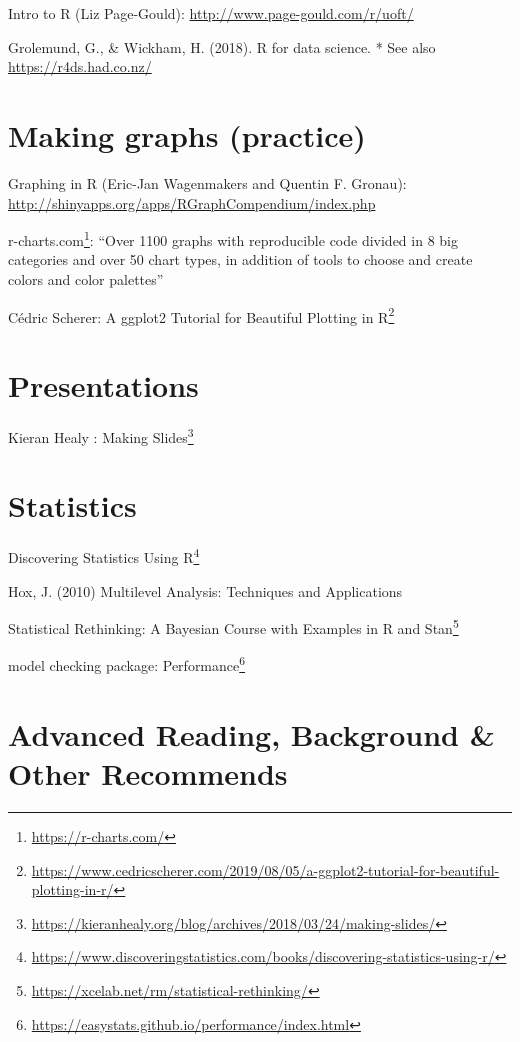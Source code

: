\documentclass[
  12pt,
  a5paper,
]{book}
\DeclareRobustCommand{\href}[2]{#2\footnote{\url{#1}}}
\begin{document}
Intro to R (Liz Page-Gould): \url{http://www.page-gould.com/r/uoft/}

Grolemund, G., \& Wickham, H. (2018). R for data science.
* See also \url{https://r4ds.had.co.nz/}

\hypertarget{making-graphs-practice}{%
\section{Making graphs (practice)}\label{making-graphs-practice}}

Graphing in R (Eric-Jan Wagenmakers and Quentin F. Gronau): \url{http://shinyapps.org/apps/RGraphCompendium/index.php}

\href{https://r-charts.com/}{r-charts.com}: ``Over 1100 graphs with reproducible code divided in 8 big categories and over 50 chart types, in addition of tools to choose and create colors and color palettes''

Cédric Scherer: \href{https://www.cedricscherer.com/2019/08/05/a-ggplot2-tutorial-for-beautiful-plotting-in-r/}{A ggplot2 Tutorial for Beautiful Plotting in R}

\hypertarget{presentations}{%
\section{Presentations}\label{presentations}}

Kieran Healy : \href{https://kieranhealy.org/blog/archives/2018/03/24/making-slides/}{Making Slides}

\hypertarget{statistics}{%
\section{Statistics}\label{statistics}}

\href{https://www.discoveringstatistics.com/books/discovering-statistics-using-r/}{Discovering Statistics Using R}

Hox, J. (2010) Multilevel Analysis: Techniques and Applications

\href{https://xcelab.net/rm/statistical-rethinking/}{Statistical Rethinking: A Bayesian Course with Examples in R and Stan}

model checking package: \href{https://easystats.github.io/performance/index.html}{Performance}

\hypertarget{advanced-reading-background-other-recommends}{%
\section{Advanced Reading, Background \& Other Recommends}\label{advanced-reading-background-other-recommends}}
\end{document}
